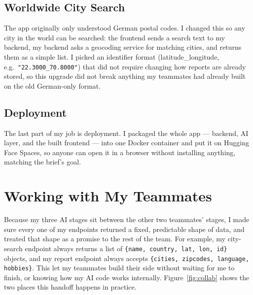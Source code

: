 \documentclass[11pt, a4paper]{article}
\begin{document}
\subsection{Worldwide City Search}

The app originally only understood German postal codes. I changed this so any city in the
world can be searched: the frontend sends a search text to my backend, my backend asks a
geocoding service for matching cities, and returns them as a simple list. I picked an
identifier format (latitude\_longitude, e.g.\ \texttt{"22.3000\_70.8000"}) that did not
require changing how reports are already stored, so this upgrade did not break anything my
teammates had already built on the old German-only format.

\subsection{Deployment}

The last part of my job is deployment. I packaged the whole app --- backend, AI layer, and
the built frontend --- into one Docker container and put it on Hugging Face Spaces, so
anyone can open it in a browser without installing anything, matching the brief's goal.

\section{Working with My Teammates}
\label{sec:collab}

Because my three AI stages sit between the other two teammates' stages, I made sure every
one of my endpoints returned a fixed, predictable shape of data, and treated that shape as
a promise to the rest of the team. For example, my city-search endpoint always returns a
list of \texttt{\{name, country, lat, lon, id\}} objects, and my report endpoint always
accepts \texttt{\{cities, zipcodes, language, hobbies\}}. This let my teammates build their
side without waiting for me to finish, or knowing how my AI code works internally.
Figure~\ref{fig:collab} shows the two places this handoff happens in practice.
\end{document}
